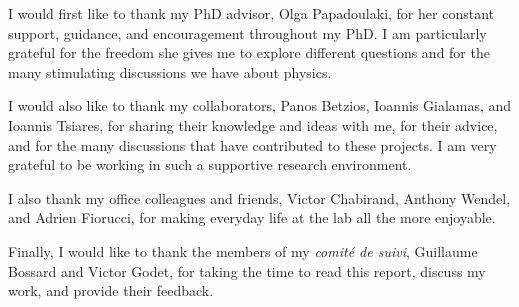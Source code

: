\documentclass[a4paper]{article}
\begin{document}
I would first like to thank my PhD advisor, Olga Papadoulaki, for her constant support, guidance, and encouragement throughout my PhD. I am particularly grateful for the freedom she gives me to explore different questions and for the many stimulating discussions we have about physics.

I would also like to thank my collaborators, Panos Betzios, Ioannis Gialamas, and Ioannis Tsiares, for sharing their knowledge and ideas with me, for their advice, and for the many discussions that have contributed to these projects. I am very grateful to be working in such a supportive research environment.

I also thank my office colleagues and friends, Victor Chabirand, Anthony Wendel, and Adrien Fiorucci, for making everyday life at the lab all the more enjoyable.

Finally, I would like to thank the members of my \textit{comité de suivi}, Guillaume Bossard and Victor Godet, for taking the time to read this report, discuss my work, and provide their feedback.


\newpage



\end{document}
